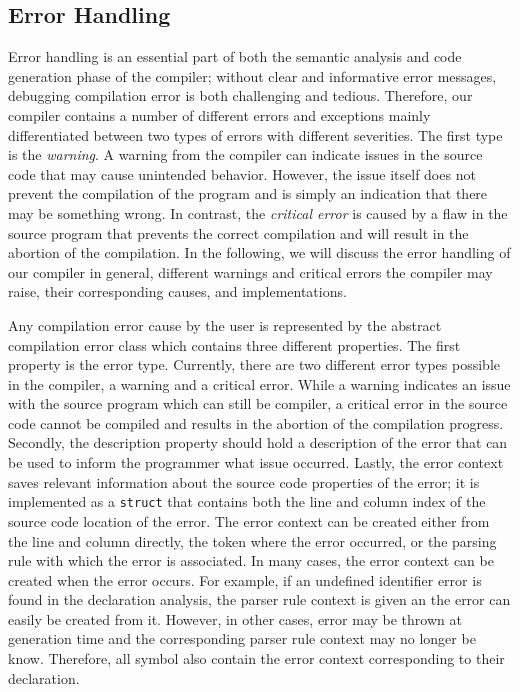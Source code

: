 \subsection{Error Handling}
\label{sec:implementation_compiler_errorHandling}
Error handling is an essential part of both the semantic analysis and code generation phase of the compiler; without clear and informative error messages, debugging compilation error is both challenging and tedious. 
Therefore, our compiler contains a number of different errors and exceptions mainly differentiated between two types of errors with different severities. The first type is the \emph{warning}. A warning from the compiler can indicate issues in the source code that may cause unintended behavior. However, the issue itself does not prevent the compilation of the program and is simply an indication that there may be something wrong. In contrast, the \emph{critical error} is caused by a flaw in the source program that prevents the correct compilation and will result in the abortion of the compilation. In the following, we will discuss the error handling of our compiler in general, different warnings and critical errors the compiler may raise, their corresponding causes, and implementations.  

Any compilation error cause by the user is represented by the abstract compilation error class which contains three different properties. The first property is the error type. Currently, there are two different error types possible in the compiler, a warning and a critical error. While a warning indicates an issue with the source program which can still be compiler, a critical error in the source code cannot be compiled and results in the abortion of the compilation progress. Secondly, the description property should hold a description of the error that can be used to inform the programmer what issue occurred. Lastly, the error context saves relevant information about the source code properties of the error; it is implemented as a \texttt{struct} that contains both the line and column index of the source code location of the error. The error context can be created either from the line and column directly, the token where the error occurred, or the parsing rule with which the error is associated. In many cases, the error context can be created when the error occurs. For example, if an undefined identifier error is found in the declaration analysis, the parser rule context is given an the error can easily be created from it. However, in other cases, error may be thrown at generation time and the corresponding parser rule context may no longer be know. Therefore, all symbol also contain the error context corresponding to their declaration. 

